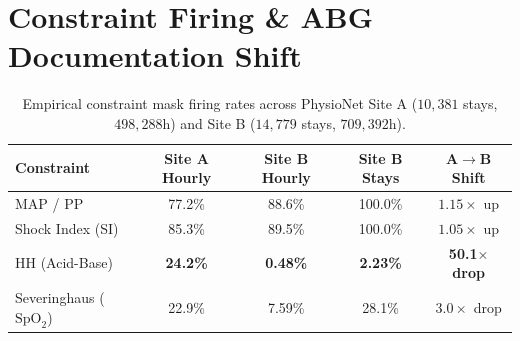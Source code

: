 \documentclass[10pt,twocolumn]{article}
\begin{document}
\appendix
\section{Constraint Firing \& ABG Documentation Shift}
\begin{table}[ht]
\centering
\caption{Empirical constraint mask firing rates across PhysioNet Site A ($10{,}381$ stays, $498{,}288$h) and Site B ($14{,}779$ stays, $709{,}392$h).}
\label{tab:abg}
\scriptsize
\begin{tabular}{lcccc}
\toprule
Constraint & Site A Hourly & Site B Hourly & Site B Stays & A$\to$B Shift \\
\midrule
MAP / PP & 77.2\% & 88.6\% & 100.0\% & $1.15\times$ up \\
Shock Index (SI) & 85.3\% & 89.5\% & 100.0\% & $1.05\times$ up \\
HH (Acid-Base) & \textbf{24.2\%} & \textbf{0.48\%} & \textbf{2.23\%} & \textbf{50.1$\times$ drop} \\
Severinghaus ($\text{SpO}_2$) & 22.9\% & 7.59\% & 28.1\% & $3.0\times$ drop \\
\bottomrule
\end{tabular}
\end{table}
\end{document}
